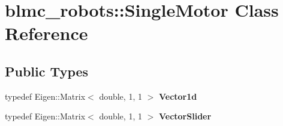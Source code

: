 \hypertarget{classblmc__robots_1_1SingleMotor}{}\section{blmc\+\_\+robots\+:\+:Single\+Motor Class Reference}
\label{classblmc__robots_1_1SingleMotor}
\subsection*{Public Types}
\begin{DoxyCompactItemize}
\item 
\mbox{\label{classblmc__robots_1_1SingleMotor_ac383dc0615dcb6b6fb1470b517561c63}} 
typedef Eigen\+::\+Matrix$<$ double, 1, 1 $>$ {\bfseries Vector1d}
\item 
\mbox{\label{classblmc__robots_1_1SingleMotor_a586b21d344037450dca9b11c8a6882b9}} 
typedef Eigen\+::\+Matrix$<$ double, 1, 1 $>$ {\bfseries Vector\+Slider}
\end{DoxyCompactItemize}
